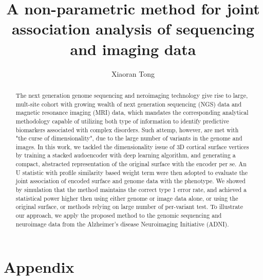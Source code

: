 \documentclass[12pt]{article}
\author{Xiaoran Tong}
\begin{document}
\title{A non-parametric method for joint association analysis of
  sequencing and imaging data}
\maketitle

\begin{abstract}
  The next generation genome sequencing and neroimaging technology
  give rise to large, mult-site cohort with growing wealth of next
  generation sequencing (NGS) data and magnetic resonance imaging
  (MRI) data, which mandates the corresponding analytical methodology
  capable of utilizing both type of information to identify predictive
  biomarkers associated with complex disorders. Such attemp, however,
  are met with "the curse of dimensionality", due to the large number
  of variants in the genome and images. In this work, we tackled the
  dimensionality issue of 3D cortical surface vertices by training a
  stacked audoencoder with deep learning algorithm, and generating a
  compact, abstracted representation of the original surface with the
  encoder per se. An U statistic with profile similarity based weight
  term were then adopted to evaluate the joint association of encoded
  surface and genome data with the phenotype. We showed by simulation
  that the method maintains the correct type 1 error rate, and
  achieved a statistical power higher then using either genome or
  image data alone, or using the original surface, or methods relying
  on large number of per-variant test. To illustrate our approach, we
  apply the proposed method to the genomic sequencing and neuroimage
  data from the Alzheimer's disease Neuroimaging Initiative (ADNI).
\end{abstract}







\printbibliography

\section{Appendix}

\end{document}
